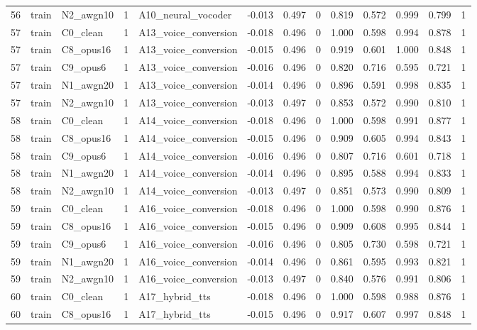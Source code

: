 \begin{tabular}{rllrlrrrrrrrr}
56 & train & N2_awgn10 & 1 & A10_neural_vocoder & -0.013 & 0.497 & 0 & 0.819 & 0.572 & 0.999 & 0.799 & 1 \\
57 & train & C0_clean & 1 & A13_voice_conversion & -0.018 & 0.496 & 0 & 1.000 & 0.598 & 0.994 & 0.878 & 1 \\
57 & train & C8_opus16 & 1 & A13_voice_conversion & -0.015 & 0.496 & 0 & 0.919 & 0.601 & 1.000 & 0.848 & 1 \\
57 & train & C9_opus6 & 1 & A13_voice_conversion & -0.016 & 0.496 & 0 & 0.820 & 0.716 & 0.595 & 0.721 & 1 \\
57 & train & N1_awgn20 & 1 & A13_voice_conversion & -0.014 & 0.496 & 0 & 0.896 & 0.591 & 0.998 & 0.835 & 1 \\
57 & train & N2_awgn10 & 1 & A13_voice_conversion & -0.013 & 0.497 & 0 & 0.853 & 0.572 & 0.990 & 0.810 & 1 \\
58 & train & C0_clean & 1 & A14_voice_conversion & -0.018 & 0.496 & 0 & 1.000 & 0.598 & 0.991 & 0.877 & 1 \\
58 & train & C8_opus16 & 1 & A14_voice_conversion & -0.015 & 0.496 & 0 & 0.909 & 0.605 & 0.994 & 0.843 & 1 \\
58 & train & C9_opus6 & 1 & A14_voice_conversion & -0.016 & 0.496 & 0 & 0.807 & 0.716 & 0.601 & 0.718 & 1 \\
58 & train & N1_awgn20 & 1 & A14_voice_conversion & -0.014 & 0.496 & 0 & 0.895 & 0.588 & 0.994 & 0.833 & 1 \\
58 & train & N2_awgn10 & 1 & A14_voice_conversion & -0.013 & 0.497 & 0 & 0.851 & 0.573 & 0.990 & 0.809 & 1 \\
59 & train & C0_clean & 1 & A16_voice_conversion & -0.018 & 0.496 & 0 & 1.000 & 0.598 & 0.990 & 0.876 & 1 \\
59 & train & C8_opus16 & 1 & A16_voice_conversion & -0.015 & 0.496 & 0 & 0.909 & 0.608 & 0.995 & 0.844 & 1 \\
59 & train & C9_opus6 & 1 & A16_voice_conversion & -0.016 & 0.496 & 0 & 0.805 & 0.730 & 0.598 & 0.721 & 1 \\
59 & train & N1_awgn20 & 1 & A16_voice_conversion & -0.014 & 0.496 & 0 & 0.861 & 0.595 & 0.993 & 0.821 & 1 \\
59 & train & N2_awgn10 & 1 & A16_voice_conversion & -0.013 & 0.497 & 0 & 0.840 & 0.576 & 0.991 & 0.806 & 1 \\
60 & train & C0_clean & 1 & A17_hybrid_tts & -0.018 & 0.496 & 0 & 1.000 & 0.598 & 0.988 & 0.876 & 1 \\
60 & train & C8_opus16 & 1 & A17_hybrid_tts & -0.015 & 0.496 & 0 & 0.917 & 0.607 & 0.997 & 0.848 & 1 \\

\end{tabular}
